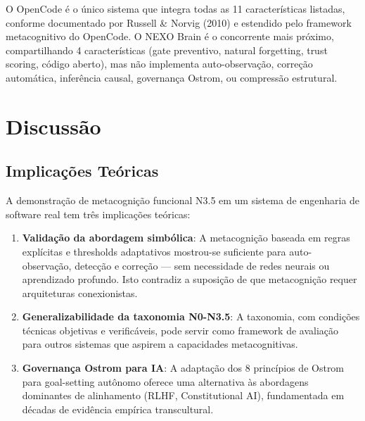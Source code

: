 O OpenCode é o único sistema que integra todas as 11 características listadas, conforme documentado por Russell \& Norvig (2010) e estendido pelo framework metacognitivo do OpenCode.  O NEXO Brain é o concorrente mais próximo, compartilhando 4 características (gate preventivo, natural forgetting, trust scoring, código aberto), mas não implementa auto-observação, correção automática, inferência causal, governança Ostrom, ou compressão estrutural.

\section{Discussão}

\subsection{Implicações Teóricas}

A demonstração de metacognição funcional N3.5 em um sistema de engenharia de software real tem três implicações teóricas:

\begin{enumerate}
    \item \textbf{Validação da abordagem simbólica}: A metacognição baseada em regras explícitas e thresholds adaptativos mostrou-se suficiente para auto-observação, detecção e correção — sem necessidade de redes neurais ou aprendizado profundo. Isto contradiz a suposição de que metacognição requer arquiteturas conexionistas.
    \item \textbf{Generalizabilidade da taxonomia N0-N3.5}: A taxonomia, com condições técnicas objetivas e verificáveis, pode servir como framework de avaliação para outros sistemas que aspirem a capacidades metacognitivas.
    \item \textbf{Governança Ostrom para IA}: A adaptação dos 8 princípios de Ostrom para goal-setting autônomo oferece uma alternativa às abordagens dominantes de alinhamento (RLHF, Constitutional AI), fundamentada em décadas de evidência empírica transcultural.
\end{enumerate}

